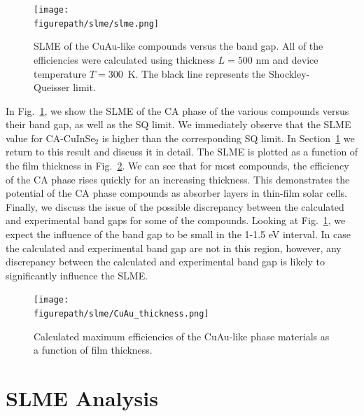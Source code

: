 \begin{refsection}
\begin{figure}
\centering
\setlength{\captionmargin}{5pt} 
\captionsetup{width=0.5\textwidth}
\texttt{[image: \\figurepath/slme/slme.png]} 
\caption{SLME of the CuAu-like compounds versus the band gap. All of the 
efficiencies were calculated using thickness $L = 500$ \si{\nano\meter} and 
device temperature $T = 300$~\si{\kelvin}. The black line represents the 
Shockley-Queisser limit.} 
\label{slme:fig-SLME} 
\end{figure} 
  
In Fig.~\ref{slme:fig-SLME}, we show the SLME of the CA phase of the various 
compounds versus their band gap, as well as the SQ limit. We immediately 
observe that the SLME value for \mbox{CA-CuInSe$_2$} is higher than the 
corresponding SQ limit. In Section~\ref{slme:sec-analysis} we return to this 
result and discuss it in detail. The SLME is plotted as a function of the film 
thickness in Fig.~\ref{slme:fig-SLME_CuAu_L}. We can see that for most 
compounds, the efficiency of the CA phase rises quickly for an increasing 
thickness. This demonstrates the potential of the CA phase compounds as 
absorber layers in thin-film solar cells. Finally, we discuss the issue of the 
possible discrepancy between the calculated and experimental band gaps for 
some of the compounds. Looking at Fig.~\ref{slme:fig-SLME}, we expect the 
influence of the band gap to be small in the 1-1.5 \si{\electronvolt} 
interval. In case the calculated and experimental band gap are not in this 
region, however, any discrepancy between the calculated and experimental band 
gap is likely to significantly influence the SLME. 

\begin{figure}[ht] 
	\centering 
		\texttt{[image: \\figurepath/slme/CuAu\_thickness.png]} 
	\caption{Calculated maximum efficiencies of the CuAu-like phase materials as 
a function of film thickness.} 
	\label{slme:fig-SLME_CuAu_L} 
\end{figure} 
 
\section{SLME Analysis} \label{slme:sec-analysis} 
 

\end{refsection}
